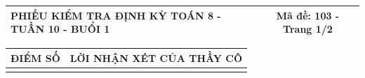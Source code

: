 \documentclass[12pt,a4paper]{article}
\begin{document}
\newpage
\noindent
\begin{tabularx}{\linewidth}{|X|c|}
\hline
\textbf{PHIẾU KIỂM TRA ĐỊNH KỲ TOÁN 8 - TUẦN 10 - BUỔI 1} & \textbf{Mã đề: 103 - Trang 1/2} \\
\hline
\end{tabularx}

\vspace{1.2mm}

\noindent
\begin{tabularx}{\linewidth}{|p{3.2cm}|X|}
\hline
\centering\textbf{ĐIỂM SỐ} & \centering\textbf{LỜI NHẬN XÉT CỦA THẦY CÔ} \tabularnewline
\hline
\rule{0pt}{1.8cm} & \tabularnewline
\hline
\end{tabularx}
\end{document}
